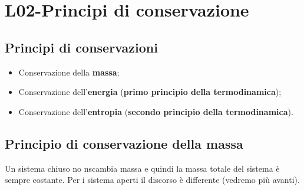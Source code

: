 \section{L02-Principi di conservazione}
\subsection{Principi di conservazioni}
\begin{itemize}
    \item Conservazione della \textbf{massa};
    \item Conservazione dell'\textbf{energia} (\textbf{primo principio della termodinamica});
    \item Conservazione dell'\textbf{entropia} (\textbf{secondo principio della termodinamica}).
\end{itemize}
\subsection{Principio di conservazione della massa}
Un sistema chiuso no nscambia massa e quindi la massa totale del sistema è sempre costante.\newline
\newline
Per i sistema aperti il discorso è differente (vedremo più avanti).
